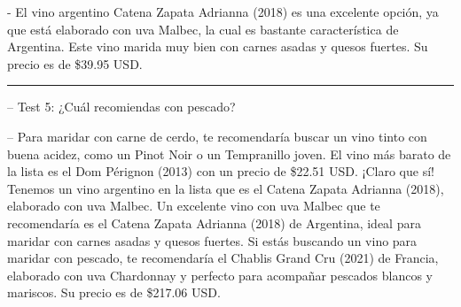 \documentclass[conference]{IEEEtran}
\begin{document}
- El vino argentino Catena Zapata Adrianna (2018) es una excelente opción, ya que está elaborado con uva Malbec, la cual es bastante característica de Argentina. Este vino marida muy bien con carnes asadas y quesos fuertes. Su precio es de \$39.95 USD.
\vspace{0.1cm}
\hrule
\vspace{0.1cm}
-- Test 5: ¿Cuál recomiendas con pescado?

-- Para maridar con carne de cerdo, te recomendaría buscar un vino tinto con buena acidez, como un Pinot Noir o un Tempranillo joven.
El vino más barato de la lista es el Dom Pérignon (2013) con un precio de \$22.51 USD.
¡Claro que sí! Tenemos un vino argentino en la lista que es el Catena Zapata Adrianna (2018), elaborado con uva Malbec.
Un excelente vino con uva Malbec que te recomendaría es el Catena Zapata Adrianna (2018) de Argentina, ideal para maridar con carnes asadas y quesos fuertes.
Si estás buscando un vino para maridar con pescado, te recomendaría el Chablis Grand Cru (2021) de Francia, elaborado con uva Chardonnay y perfecto para acompañar pescados blancos y mariscos. Su precio es de \$217.06 USD.




\end{document}
